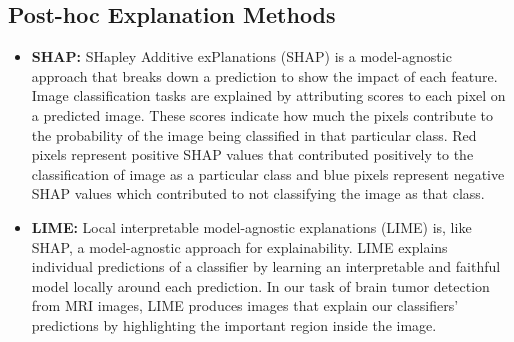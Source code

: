 \subsection{Post-hoc Explanation Methods}
\begin{itemize}[leftmargin=0cm]
    \setlength\itemsep{0.6em}
    \item[]
    \textbf{SHAP:}    
    SHapley Additive exPlanations (SHAP) \citep{lundberg2017unified} is a model-agnostic approach that breaks down a prediction to show the impact of each feature. Image classification tasks are explained by attributing scores to each pixel on a predicted image. These scores indicate how much the pixels contribute to the probability of the image being classified in that particular class. Red pixels represent positive SHAP values that contributed positively to the classification of image as a particular class and blue pixels represent negative SHAP values which contributed to not classifying the image as that class.
    
    \item[]
    \textbf{LIME:}
    Local interpretable model-agnostic explanations (LIME) \citep{lime} is, like SHAP, a model-agnostic approach for explainability. LIME explains individual predictions of a classifier by learning an interpretable and faithful model locally around each prediction. In our task of brain tumor detection from MRI images, LIME produces images that explain our classifiers' predictions by highlighting the important region inside the image.
\end{itemize}

